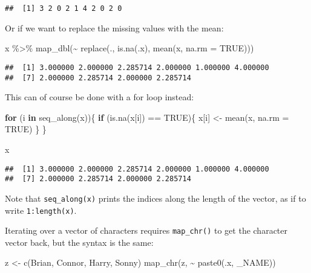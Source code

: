 \documentclass[
]{book}
\newenvironment{Shaded}{\begin{snugshade}}{\end{snugshade}}
\newcommand{\AttributeTok}[1]{\textcolor[rgb]{0.77,0.63,0.00}{#1}}
\newcommand{\ConstantTok}[1]{\textcolor[rgb]{0.00,0.00,0.00}{#1}}
\newcommand{\ControlFlowTok}[1]{\textcolor[rgb]{0.13,0.29,0.53}{\textbf{#1}}}
\newcommand{\FunctionTok}[1]{\textcolor[rgb]{0.00,0.00,0.00}{#1}}
\newcommand{\NormalTok}[1]{#1}
\newcommand{\OtherTok}[1]{\textcolor[rgb]{0.56,0.35,0.01}{#1}}
\newcommand{\SpecialCharTok}[1]{\textcolor[rgb]{0.00,0.00,0.00}{#1}}
\newcommand{\StringTok}[1]{\textcolor[rgb]{0.31,0.60,0.02}{#1}}
\begin{document}
\begin{verbatim}
##  [1] 3 2 0 2 1 4 2 0 2 0
\end{verbatim}

Or if we want to replace the missing values with the mean:

\begin{Shaded}
\begin{Highlighting}[]
\NormalTok{x }\SpecialCharTok{\%\textgreater{}\%} \FunctionTok{map\_dbl}\NormalTok{(}\SpecialCharTok{\textasciitilde{}} \FunctionTok{replace}\NormalTok{(., }\FunctionTok{is.na}\NormalTok{(.x), }\FunctionTok{mean}\NormalTok{(x, }\AttributeTok{na.rm =} \ConstantTok{TRUE}\NormalTok{)))}
\end{Highlighting}
\end{Shaded}

\begin{verbatim}
##  [1] 3.000000 2.000000 2.285714 2.000000 1.000000 4.000000
##  [7] 2.000000 2.285714 2.000000 2.285714
\end{verbatim}

This can of course be done with a for loop instead:

\begin{Shaded}
\begin{Highlighting}[]
\ControlFlowTok{for}\NormalTok{ (i }\ControlFlowTok{in} \FunctionTok{seq\_along}\NormalTok{(x))\{}
  \ControlFlowTok{if}\NormalTok{ (}\FunctionTok{is.na}\NormalTok{(x[i]) }\SpecialCharTok{==} \ConstantTok{TRUE}\NormalTok{)\{}
\NormalTok{    x[i] }\OtherTok{\textless{}{-}} \FunctionTok{mean}\NormalTok{(x, }\AttributeTok{na.rm =} \ConstantTok{TRUE}\NormalTok{)}
\NormalTok{  \}}
\NormalTok{\}}

\NormalTok{x}
\end{Highlighting}
\end{Shaded}

\begin{verbatim}
##  [1] 3.000000 2.000000 2.285714 2.000000 1.000000 4.000000
##  [7] 2.000000 2.285714 2.000000 2.285714
\end{verbatim}

Note that \texttt{seq\_along(x)} prints the indices along the length of the vector, as if to write \texttt{1:length(x)}.

Iterating over a vector of characters requires \texttt{map\_chr()} to get the character vector back, but the syntax is the same:

\begin{Shaded}
\begin{Highlighting}[]
\NormalTok{z }\OtherTok{\textless{}{-}} \FunctionTok{c}\NormalTok{(}\StringTok{\textquotesingle{}Brian\textquotesingle{}}\NormalTok{, }\StringTok{\textquotesingle{}Connor\textquotesingle{}}\NormalTok{, }\StringTok{\textquotesingle{}Harry\textquotesingle{}}\NormalTok{, }\StringTok{\textquotesingle{}Sonny\textquotesingle{}}\NormalTok{)}
\FunctionTok{map\_chr}\NormalTok{(z, }\SpecialCharTok{\textasciitilde{}} \FunctionTok{paste0}\NormalTok{(.x, }\StringTok{\textquotesingle{}\_NAME\textquotesingle{}}\NormalTok{))}
\end{Highlighting}
\end{Shaded}
\end{document}
